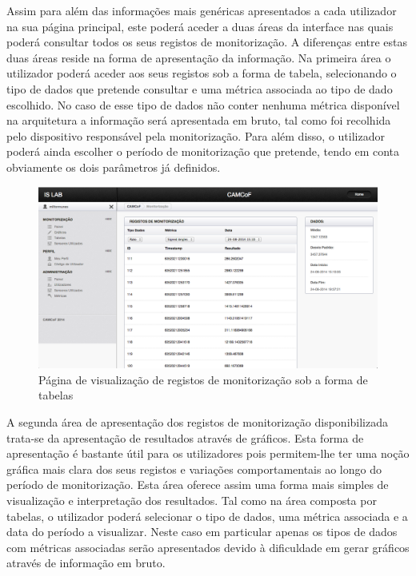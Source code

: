 Assim para além das informações mais genéricas apresentados a cada utilizador na sua página principal, este poderá aceder a duas áreas da interface nas quais poderá consultar todos os seus registos de monitorização. A diferenças entre estas duas áreas reside na forma de apresentação da informação. Na primeira área o utilizador poderá aceder aos seus registos sob a forma de tabela, selecionando o tipo de dados que pretende consultar e uma métrica associada ao tipo de dado escolhido. No caso de esse tipo de dados não conter nenhuma métrica disponível na arquitetura a informação será apresentada em bruto, tal como foi recolhida pelo dispositivo responsável pela monitorização. Para além disso, o utilizador poderá ainda escolher o período de monitorização que pretende, tendo em conta obviamente os dois parâmetros já definidos.

 \begin{figure}[htb]
   \centering
   \includegraphics[scale=0.29]{Images/tables.png}
   \caption{Página de visualização de registos de monitorização sob a forma de tabelas}
\end{figure}

A segunda área de apresentação dos registos de monitorização disponibilizada trata-se da apresentação de resultados através de gráficos. Esta forma de apresentação é bastante útil para os utilizadores pois permitem-lhe ter uma noção gráfica mais clara dos seus registos e variações comportamentais ao longo do período de monitorização. Esta área oferece assim uma forma mais simples de visualização e interpretação dos resultados. Tal como na área composta por tabelas, o utilizador poderá selecionar o tipo de dados, uma métrica associada e a data do período a visualizar. Neste caso em particular apenas os tipos de dados com métricas associadas serão apresentados devido à dificuldade em gerar gráficos através de informação em bruto.

